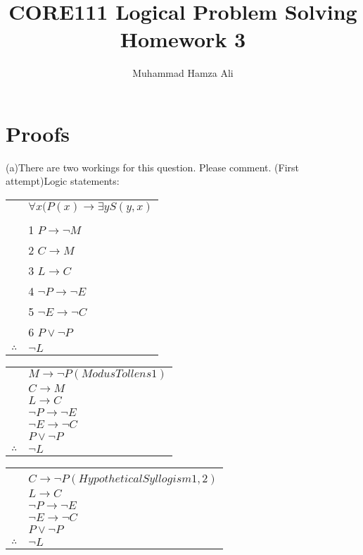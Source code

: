 \documentclass{article}
\title{CORE111 Logical Problem Solving\\Homework 3}
\author{Muhammad Hamza Ali}
\begin{document}
\maketitle

\section{Proofs}

(a)There are two workings for this question. Please comment. \newline (First attempt)Logic statements: 

\begin{tabular}{c@{\,}l@{}} 
                         & $\forall x (P(x) \rightarrow \exists y  S(y,x) $ \\
                         \\
                         & 1 $P \rightarrow \neg M$ \\
                         & 2 $C \rightarrow M$ \\
                         & 3 $L \rightarrow C$ \\
                         & 4 $\neg P \rightarrow \neg E$ \\
                         & 5 $\neg E \rightarrow \neg C$ \\
\arrayrulecolor{blue}    & 6 $P \vee \neg P$ \\
\cline{2-2}
    $\therefore$         & $\neg L$ \\
\end{tabular}
\begin{tabular}{c@{\,}l@{}} 
                         & $M \rightarrow \neg P (Modus Tollens 1)$ \\
                         & $C \rightarrow M$ \\
                         & $L \rightarrow C$ \\
                         & $\neg P \rightarrow \neg E$ \\
                         & $\neg E \rightarrow \neg C$ \\
\arrayrulecolor{blue}    & $P \vee \neg P$ \\
\cline{2-2}
    $\therefore$         & $\neg L$ \\
\end{tabular}
\begin{tabular}{c@{\,}l@{}} 
                         &\\ & $C \rightarrow \neg P (Hypothetical Syllogism 1,2)$ \\
                         & $L \rightarrow C$ \\
                         & $\neg P \rightarrow \neg E$ \\
                         & $\neg E \rightarrow \neg C$ \\
\arrayrulecolor{blue}    & $P \vee \neg P$ \\
\cline{2-2}
    $\therefore$         & $\neg L$ \\
\end{tabular}
\end{document}
